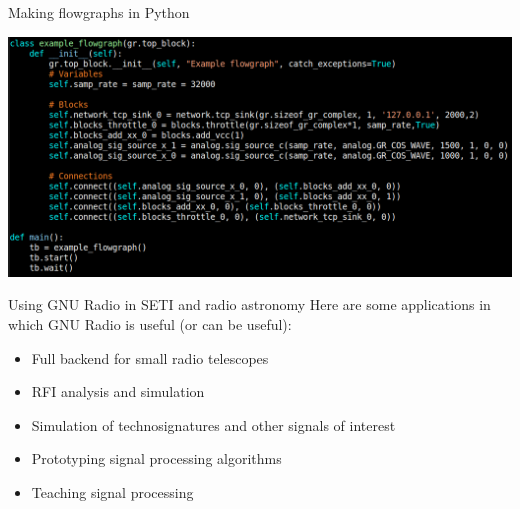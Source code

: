 \documentclass[aspectratio=169]{beamer}
\begin{document}
\begin{frame}{Making flowgraphs in Python}
  \begin{center}
    \includegraphics[width=\textwidth]{python_flowgraph}
  \end{center}
\end{frame}

\begin{frame}{Using GNU Radio in SETI and radio astronomy}
  Here are some applications in which GNU Radio is useful (or can be useful):
  \begin{itemize}
  \item Full backend for small radio telescopes
  \item RFI analysis and simulation
  \item Simulation of technosignatures and other signals of interest
  \item Prototyping signal processing algorithms
  \item Teaching signal processing
  \end{itemize}
\end{frame}
\end{document}
